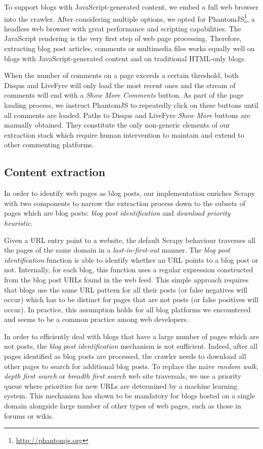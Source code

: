 To support blogs with JavaScript-generated content, we embed a full web 
browser into the crawler. After considering multiple options, we opted 
for PhantomJS\footnote{\url{http://phantomjs.org}}, a headless web 
browser with great performance and scripting capabilities. The JavaScript 
rendering is the very first step of web page processing. Therefore, 
extracting blog post articles, comments or multimedia files works equally 
well on blogs with JavaScript-generated content and on traditional 
HTML-only blogs.

When the number of comments on a page exceeds a certain threshold, both 
Disqus and LiveFyre will only load the most recent ones and the stream 
of comments will end with a \emph{Show More Comments} button. As part of 
the page loading process, we instruct PhantomJS to repeatedly click on 
these buttons until all comments are loaded. Paths to Disqus and LiveFyre 
\emph{Show More} buttons are manually obtained. They constitute the 
only non-generic elements of our extraction stack which require human 
intervention to maintain and extend to other commenting platforms.

\subsection{Content extraction}\label{enrichingscrapy}

In order to identify web pages as blog posts, our implementation enriches 
Scrapy with two components to narrow the extraction process down to the 
subsets of pages which are blog posts: \emph{blog post identification} 
and \emph{download priority heuristic}.

Given a URL entry point to a website, the default Scrapy behaviour 
traverses all the pages of the same domain in a \emph{last-in-first-out} 
manner. The \emph{blog post identification} function is able to identify 
whether an URL points to a blog post or not. Internally, for each blog, 
this function uses a regular expression constructed from the blog post 
URLs found in the web feed. This simple approach requires that blogs use 
the same URL pattern for all their posts (or false negatives will occur) 
which has to be distinct for pages that are not posts (or false positives 
will occur). In practice, this assumption holds for all blog platforms 
we encountered and seems to be a common practice among web developers.

In order to efficiently deal with blogs that have a large number of 
pages which are not posts, the \emph{blog post identification} mechanism 
is not sufficient. Indeed, after all pages identified as blog posts 
are processed, the crawler needs to download all other pages to search 
for additional blog posts. To replace the naive \emph{random walk}, 
\emph{depth first search} or \emph{breadth first search} web site 
traversals, we use a priority queue where priorities for new URLs are 
determined by a machine learning system. This mechanism has shown 
to be mandatory for blogs hosted on a single domain alongside large 
number of other types of web pages, such as those in forums or wikis.

